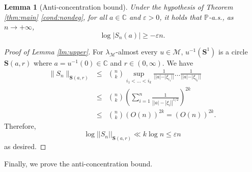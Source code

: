 \documentclass[12pt, reqno]{amsart}
\theoremstyle{plain}
\newtheorem{lemma}[theorem]{Lemma}
\theoremstyle{definition}
\newcommand\C{{\mathbb{C}}}
\renewcommand\P{{\mathbb{P}}}
\newcommand{\ep}{\varepsilon}
\begin{document}
 \begin{lemma} [Anti-concentration bound]\label{lm:lower}
 	Under the hypothesis of Theorem \ref{thm:main} \eqref{cond:nondeg}, for all $a\in \C$ and $\ep>0$, it holds that $\P$-a.s., as $n \to +\infty$,
 	$$\log |S_n(a)| \ge -\ep n.$$
 \end{lemma}
 \begin{proof}[Proof of Lemma \ref{lm:upper}] For $\lambda_{\mathcal{M}}$-almost every $u \in \mathcal{M}$, $u^{-1}(\mathbf S^1)$ is a circle $\mathbf{S}(a, r)$ where $a = u^{-1}(0)\in \C$ and $r\in (0, \infty)$.
 	We have
 	\begin{eqnarray*}
 		\|S_n\|_{\mathbf S(a, r)} &\le& {n\choose k} \sup_{i_1<\dots<i_k} \frac{1}{||a| - |\xi_{i_1}||}\dots  \frac{1}{||a| - |\xi_{i_k}||}\\
 		&\le& {n\choose k} \left (\sum_{i=1}^{n}\frac{1}{\left ||a| - |\xi_{i}|\right |^{1/2}}\right )^{2k}\\
 		&\le& {n\choose k} \left (O(n)\right )^{2k} = (O(n))^{2k}.
 	\end{eqnarray*}
 	Therefore, 
 	$$\log ||S_n||_{\mathbf S(a, r)} \ll k\log n\le \ep n$$
 	as desired.   
 \end{proof}
 Finally, we prove the anti-concentration bound.
\end{document}
